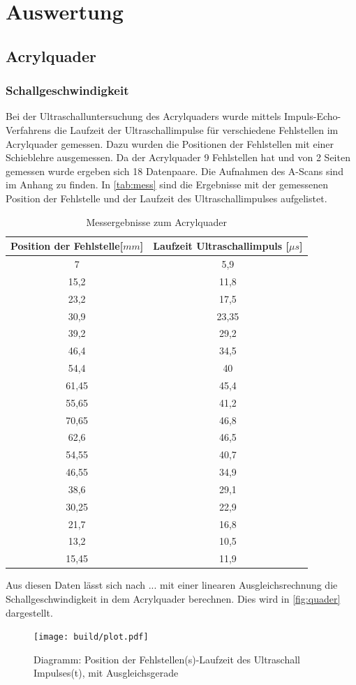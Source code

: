 \section{Auswertung}
\label{sec:Auswertung}
\subsection{Acrylquader}
\subsubsection{Schallgeschwindigkeit}
Bei der Ultraschalluntersuchung des Acrylquaders wurde mittels Impuls-Echo-Verfahrens die Laufzeit der Ultraschallimpulse für verschiedene Fehlstellen im Acrylquader gemessen. Dazu wurden die Positionen der Fehlstellen mit einer Schieblehre ausgemessen. Da der Acrylquader 9 Fehlstellen hat und von 2 Seiten gemessen wurde ergeben sich 18 Datenpaare. Die Aufnahmen des A-Scans sind im Anhang zu finden. In \autoref{tab:mess} sind die Ergebnisse mit der gemessenen Position der Fehlstelle und der Laufzeit des Ultraschallimpulses aufgelistet.
\begin{table}
  \centering
  \caption{Messergebnisse zum Acrylquader}
\label{tab:mess}
  \begin{tabular}{c c }
  \toprule
  Position der Fehlstelle[$mm$] & Laufzeit Ultraschallimpuls [$\mu s$]\\
  \midrule
  7 & 5,9 \\
  15,2 & 11,8 \\
  23,2 & 17,5 \\
  30,9 & 23,35 \\
  39,2 & 29,2 \\
  46,4 & 34,5 \\
  54,4 & 40 \\
  61,45 & 45,4 \\
  55,65 & 41,2 \\
  70,65 & 46,8 \\
  62,6 & 46,5 \\
  54,55 & 40,7 \\
  46,55 & 34,9 \\
  38,6 & 29,1 \\
  30,25 & 22,9 \\
  21,7 & 16,8 \\
  13,2 & 10,5 \\
  15,45 & 11,9 \\
  \bottomrule
  \end{tabular}
\end{table} 
\newpage
Aus diesen Daten lässt sich nach ... mit einer linearen Ausgleichsrechnung die Schallgeschwindigkeit in dem Acrylquader berechnen. Dies wird in \autoref{fig:quader} dargestellt.
\begin{figure}[H]
  \centering
  \texttt{[image: build/plot.pdf]}
  \caption{Diagramm: Position der Fehlstellen(s)-Laufzeit des Ultraschall Impulses(t), mit Ausgleichsgerade}
  \label{fig:quader}
\end{figure}

